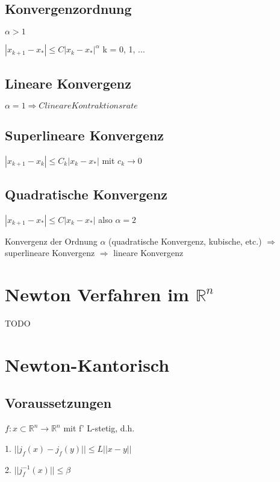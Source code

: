 \documentclass[12pt,a4paper]{article} %
\newcommand*\tab[1][1cm]{\hspace*{#1}}
\begin{document}
	\subsection{Konvergenzordnung}
	
	$\alpha > 1$
	
	$|x_{k + 1} - x_*| \le C|x_k - x_*|^\alpha$ \tab k = 0, 1, ...
	
	\subsection{Lineare Konvergenz}
	
	$\alpha = 1 \Rightarrow C lineare Kontraktionsrate$
	
	\subsection{Superlineare Konvergenz}
	
	$|x_{k + 1} - x_k| \le C_k |x_k - x_*|$ \tab mit $c_k \rightarrow 0$
	
	\subsection{Quadratische Konvergenz}
	
	$|x_{k + 1} - x_*| \le C |x_k - x_*|$ \tab also $\alpha = 2$
	
	Konvergenz der Ordnung $\alpha$ (quadratische Konvergenz, kubische, etc.) $\Rightarrow$ superlineare Konvergenz $\Rightarrow$ lineare Konvergenz
	
	\section{Newton Verfahren im \texorpdfstring{$\mathbb{R}^n$}{R pow(n)}}
	
	TODO
	
	\section{Newton-Kantorisch}
	
	\subsection{Voraussetzungen}
	
	$f: x \subset \mathbb{R}^n \rightarrow \mathbb{R}^n$ mit f' L-stetig, d.h.
	
	1. $|| j_f(x) - j_f(y)|| \le L||x - y||$
	
	2. $||j_f^{-1}(x)|| \le \beta$
	
\end{document}
